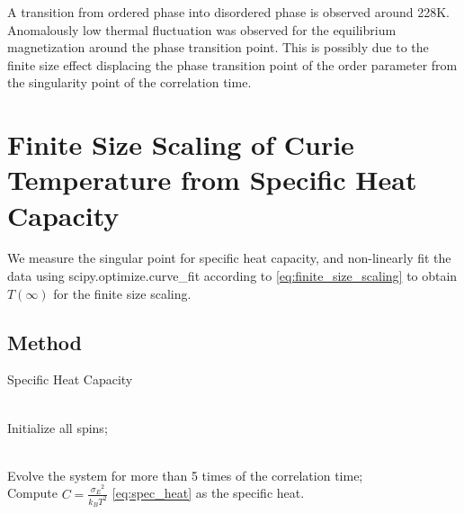 \documentclass[%
showkeys,
bibnotes,
amsmath,amssymb,
floatfix,
]{revtex4-1}
\begin{document}
A transition from ordered phase into disordered phase is observed around 228K. Anomalously low thermal fluctuation was observed for the equilibrium magnetization around the phase transition point. This is possibly due to the finite size effect displacing the phase transition point of the order parameter from the singularity point of the correlation time.

\section{\label{sec:level1}Finite Size Scaling of Curie Temperature from Specific Heat Capacity}

We measure the singular point for specific heat capacity, and non-linearly fit the data using scipy.optimize.curve\_fit according to \ref{eq:finite_size_scaling} to obtain $T(\infty)$ for the finite size scaling.

\subsection{\label{sec:level2}Method}

\begin{algorithm}[H]
	\caption{Specific Heat Capacity}
	\label{alg:spec_heat}
	\begin{algorithmic}
		\REQUIRE ~~\\
		
		Initialize all spins;\\
		\label{code:equi_mag:initialize}
		
		\ENSURE ~~\\
		Evolve the system for more than 5 times of the correlation time;\\
		\label{code:equi_mag:evolve}
		Compute $C = \frac{{\sigma_E}^2}{k_B T^2}$ \ref{eq:spec_heat} as the specific heat.
		
	\end{algorithmic}
\end{algorithm}
\end{document}
